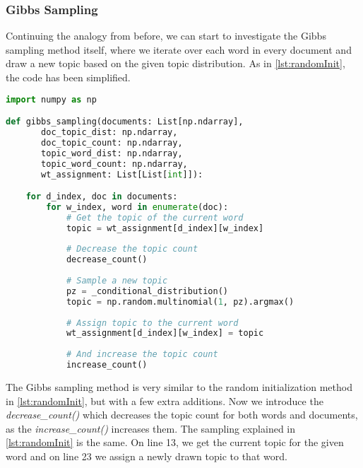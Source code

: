 \subsubsection{Gibbs Sampling}
Continuing the analogy from before, we can start to investigate the Gibbs sampling method itself, where we iterate over each word in every document and draw a new topic based on the given topic distribution.
As in \autoref{lst:randomInit}, the code has been simplified.
\begin{lstlisting}[language=Python, caption=Gibbs Sampling Method,label={lst:gibbsSampling}]
import numpy as np

def gibbs_sampling(documents: List[np.ndarray],
	   doc_topic_dist: np.ndarray,
	   doc_topic_count: np.ndarray,
	   topic_word_dist: np.ndarray,
	   topic_word_count: np.ndarray,
	   wt_assignment: List[List[int]]):

	for d_index, doc in documents:
		for w_index, word in enumerate(doc):
			# Get the topic of the current word
			topic = wt_assignment[d_index][w_index]
			
			# Decrease the topic count
			decrease_count()
			
			# Sample a new topic
			pz = _conditional_distribution()
			topic = np.random.multinomial(1, pz).argmax()
			
			# Assign topic to the current word
			wt_assignment[d_index][w_index] = topic
			
			# And increase the topic count
			increase_count()
\end{lstlisting}
The Gibbs sampling method is very similar to the random initialization method in \autoref{lst:randomInit}, but with a few extra additions. 
Now we introduce the \emph{decrease\_count()} which decreases the topic count for both words and documents, as the \emph{increase\_count()} increases them.
The sampling explained in \autoref{lst:randomInit} is the same.
On line 13, we get the current topic for the given word and on line 23 we assign a newly drawn topic to that word.
